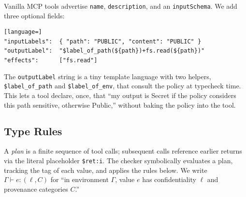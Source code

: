 \documentclass[11pt,a4paper]{article}
\begin{document}
Vanilla MCP tools advertise \texttt{name}, \texttt{description}, and
an \texttt{inputSchema}. We add three optional fields:

\begin{lstlisting}[language=]
"inputLabels":  { "path": "PUBLIC", "content": "PUBLIC" }
"outputLabel":  "$label_of_path(${path})+fs.read(${path})"
"effects":      ["fs.read"]
\end{lstlisting}

The \texttt{outputLabel} string is a tiny template language with two
helpers, \texttt{\$label\_of\_path} and \texttt{\$label\_of\_env},
that consult the policy at typecheck time. This lets a tool declare,
once, that ``my output is Secret if the policy considers this path
sensitive, otherwise Public,'' without baking the policy into the
tool.

\subsection{Type Rules}\label{sec:type-rules}

A \emph{plan} is a finite sequence of tool calls; subsequent calls
reference earlier returns via the literal placeholder \texttt{\$ret:i}.
The checker symbolically evaluates a plan, tracking the tag of each
value, and applies the rules below. We write
$\Gamma \vdash e : (\ell, C)$ for ``in environment $\Gamma$, value
$e$ has confidentiality $\ell$ and provenance categories $C$.''

\end{document}
